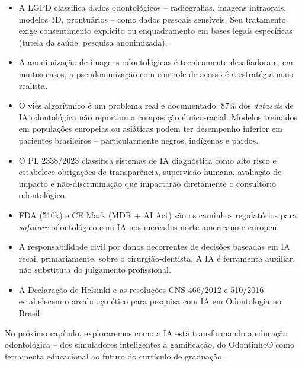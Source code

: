 \begin{itemize}
  \item A LGPD classifica dados odontológicos -- radiografias, imagens
    intraorais, modelos 3D, prontuários -- como dados pessoais sensíveis. Seu
    tratamento exige consentimento explícito ou enquadramento em bases legais
    específicas (tutela da saúde, pesquisa anonimizada).

  \item A anonimização de imagens odontológicas é tecnicamente desafiadora e,
    em muitos casos, a pseudonimização com controle de acesso é a estratégia
    mais realista.

  \item O viés algorítmico é um problema real e documentado: 87\% dos
    \textit{datasets} de IA odontológica não reportam a composição étnico-racial.
    Modelos treinados em populações europeias ou asiáticas podem ter desempenho
    inferior em pacientes brasileiros -- particularmente negros, indígenas e
    pardos.

  \item O PL 2338/2023 classifica sistemas de IA diagnóstica como alto risco e
    estabelece obrigações de transparência, supervisão humana, avaliação de
    impacto e não-discriminação que impactarão diretamente o consultório
    odontológico.

  \item FDA (510k) e CE Mark (MDR + AI Act) são os caminhos regulatórios para
    \textit{software} odontológico com IA nos mercados norte-americano e europeu.

  \item A responsabilidade civil por danos decorrentes de decisões baseadas em
    IA recai, primariamente, sobre o cirurgião-dentista. A IA é ferramenta
    auxiliar, não substituta do julgamento profissional.

  \item A Declaração de Helsinki e as resoluções CNS 466/2012 e 510/2016
    estabelecem o arcabouço ético para pesquisa com IA em Odontologia no Brasil.
\end{itemize}


No próximo capítulo, exploraremos como a IA está transformando a educação
odontológica -- dos simuladores inteligentes à gamificação, do Odontinho® como
ferramenta educacional ao futuro do currículo de graduação.

\endinput
